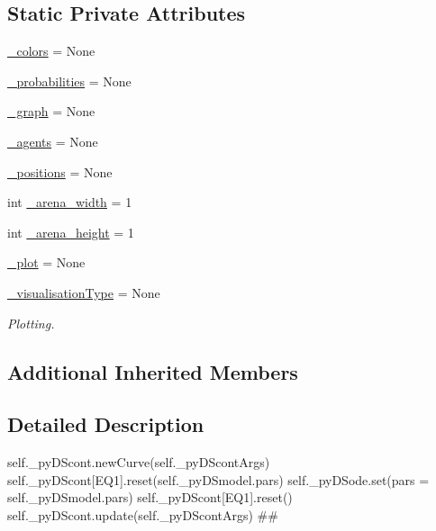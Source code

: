 \subsection*{Static Private Attributes}
\begin{DoxyCompactItemize}
\item 
\hyperlink{class_mu_mo_t_1_1_mu_mo_tmultiagent_view_a6aaed74c935ed5380691798f75527a18}{\+\_\+colors} = None
\item 
\hyperlink{class_mu_mo_t_1_1_mu_mo_tmultiagent_view_aaf2c34c5022e4e3c872dbee11e50ea9b}{\+\_\+probabilities} = None
\item 
\hyperlink{class_mu_mo_t_1_1_mu_mo_tmultiagent_view_a752f43042d51a40fed348b434aad0fd8}{\+\_\+graph} = None
\item 
\hyperlink{class_mu_mo_t_1_1_mu_mo_tmultiagent_view_a5032de31aad9de4528138249999e7d5f}{\+\_\+agents} = None
\item 
\hyperlink{class_mu_mo_t_1_1_mu_mo_tmultiagent_view_a8be9986760a86837e04718906d18d596}{\+\_\+positions} = None
\item 
int \hyperlink{class_mu_mo_t_1_1_mu_mo_tmultiagent_view_a372c083f5428e7f8a68298ec9dcca941}{\+\_\+arena\+\_\+width} = 1
\item 
int \hyperlink{class_mu_mo_t_1_1_mu_mo_tmultiagent_view_a12711c70e125709b78f820722ba74d09}{\+\_\+arena\+\_\+height} = 1
\item 
\hyperlink{class_mu_mo_t_1_1_mu_mo_tmultiagent_view_acdfed4631d661bc2ad215c25a2ed8260}{\+\_\+plot} = None
\item 
\hyperlink{class_mu_mo_t_1_1_mu_mo_tmultiagent_view_ae8c8d7969b8ab8f31df9d1d1d10eabb9}{\+\_\+visualisation\+Type} = None
\begin{DoxyCompactList}\small\item\em Plotting. \end{DoxyCompactList}\end{DoxyCompactItemize}
\subsection*{Additional Inherited Members}


\subsection{Detailed Description}
self.\+\_\+py\+D\+Scont.\+new\+Curve(self.\+\_\+py\+D\+Scont\+Args) self.\+\_\+py\+D\+Scont\mbox{[}\textquotesingle{}E\+Q1\textquotesingle{}\mbox{]}.reset(self.\+\_\+py\+D\+Smodel.\+pars) self.\+\_\+py\+D\+Sode.\+set(pars = self.\+\_\+py\+D\+Smodel.\+pars) self.\+\_\+py\+D\+Scont\mbox{[}\textquotesingle{}E\+Q1\textquotesingle{}\mbox{]}.reset() self.\+\_\+py\+D\+Scont.\+update(self.\+\_\+py\+D\+Scont\+Args) \#\# 

